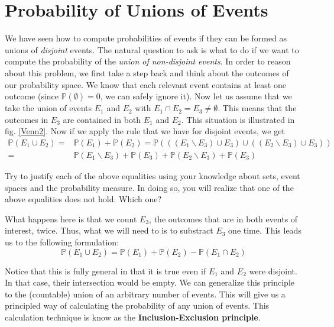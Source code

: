 \documentclass[a4paper,11pt,leqno]{report}
\begin{document}
\section{Probability of Unions of Events}
We have seen how to compute probabilities of events if they can be formed as unions of \textit{disjoint}
events. The natural question to ask is what to do if we want to compute the probability of the \emph{union
of non-disjoint events}. In order to reason about this problem, we first take a step back and think about the
outcomes of our probability space. We know that each relevant event contains at least one outcome (since
$ \mathbb{P}(\emptyset) = 0 $, we can safely ignore it). Now let us assume that we take the union of events
$ E_{1} $ and $ E_{2} $ with $ E_{1} \cap E_{2} = E_{3} \not = \emptyset $. This means that the outcomes
in $ E_{3} $ are contained in both $ E_{1} $ and $ E_{2} $. This situation is illustrated in fig. 
\ref{Venn2}. Now if we apply the rule that we have for disjoint events, we get 
\begin{align} \label{InExFalse}
\mathbb{P}(E_{1} \cup E_{2}) =& \mathbb{P}(E_{1}) + \mathbb{P}(E_{2})
= \mathbb{P}(((E_{1}\backslash E_{3}) \cup E_{3}) \cup ((E_{2}\backslash E_{3}) \cup E_{3})) \\
=& \mathbb{P}(E_{1}\backslash E_{3}) + \mathbb{P}(E_{3}) + \mathbb{P}(E_{2}\backslash E_{3}) \nonumber
+ \mathbb{P}(E_{3})
\end{align}

\begin{Exercise}
Try to justify each of the above equalities using your knowledge about sets, event spaces and the 
probability measure. In doing so, you will realize that one of the above equalities does not hold.
Which one? 
\end{Exercise}

What happens here is that we count $ E_{3} $, the outcomes that are in both events of interest, twice.
Thus, what we will need to is to substract $ E_{3} $ one time. This leads us to the following formulation:
\begin{equation}
\mathbb{P}(E_{1} \cup E_{2}) = \mathbb{P}(E_{1}) + \mathbb{P}(E_{2}) - \mathbb{P}(E_{1} \cap E_{2})
\end{equation}

Notice that this is fully general in that it is true even if $ E_{1} $ and $ E_{2} $ were disjoint. In that
case, their intersection would be empty. We can generalize this principle to the (countable) union of
an arbitrary number of events. This will give us a principled way of calculating the probability of any
union of events. This calculation technique is know as the \textbf{Inclusion-Exclusion principle}.
\end{document}
